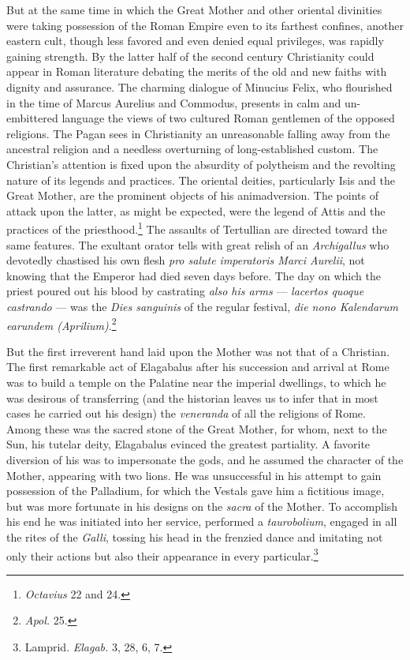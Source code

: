 \documentclass[a4paper, 11pt, oneside, polutonikogreek, french]{article}
\begin{document}
But at the same time in which the Great Mother and other oriental divinities were taking possession of the Roman Empire even to its farthest confines, another eastern cult, though less favored and even denied equal privileges, was rapidly gaining strength. By the latter half of the second century Christianity could appear in Roman literature debating the merits of the old and new faiths with dignity and assurance. The charming dialogue of Minucius Felix, who flourished in the time of Marcus Aurelius and Commodus, presents in calm and un-embittered language the views of two cultured Roman gentlemen of the opposed religions. The Pagan sees in Christianity an unreasonable falling away from the ancestral religion and a needless overturning of long-established custom. The Christian's attention is fixed upon the absurdity of polytheism and the revolting nature of its legends and practices. The oriental deities, particularly Isis and the Great Mother, are the prominent objects of his animadversion. The points of attack upon the latter, as might be expected, were the legend of Attis and the practices of the priesthood.\footnote{\emph{Octavius} 22 and 24.} The assaults of Tertullian are directed toward the same features. The exultant orator tells with great relish of an \emph{Archigallus} who devotedly chastised his own flesh \emph{pro salute imperatoris Marci Aurelii}, not knowing that the Emperor had died seven days before. The day on which the priest poured out his blood by castrating \emph{also his arms} --- \emph{lacertos quoque castrando} --- was the \emph{Dies sanguinis} of the regular festival, \emph{die nono Kalendarum earundem (Aprilium)}.\footnote{\emph{Apol.} 25.}

But the first irreverent hand laid upon the Mother was not that of a Christian. The first remarkable act of Elagabalus after his succession and arrival at Rome was to build a temple on the Palatine near the imperial dwellings, to which he was desirous of transferring (and the historian leaves us to infer that in most cases he carried out his design) the \emph{veneranda} of all the religions of Rome. Among these was the sacred stone of the Great Mother, for whom, next to the Sun, his tutelar deity, Elagabalus evinced the greatest partiality. A favorite diversion of his was to impersonate the gods, and he assumed the character of the Mother, appearing with two lions. He was unsuccessful in his attempt to gain possession of the Palladium, for which the Vestals gave him a fictitious image, but was more fortunate in his designs on the \emph{sacra} of the Mother. To accomplish his end he was initiated into her service, performed a \emph{taurobolium}, engaged in all the rites of the \emph{Galli}, tossing his head in the frenzied dance and imitating not only their actions but also their appearance in every particular.\footnote{Lamprid. \emph{Elagab.} 3, 28, 6, 7.}
\end{document}
